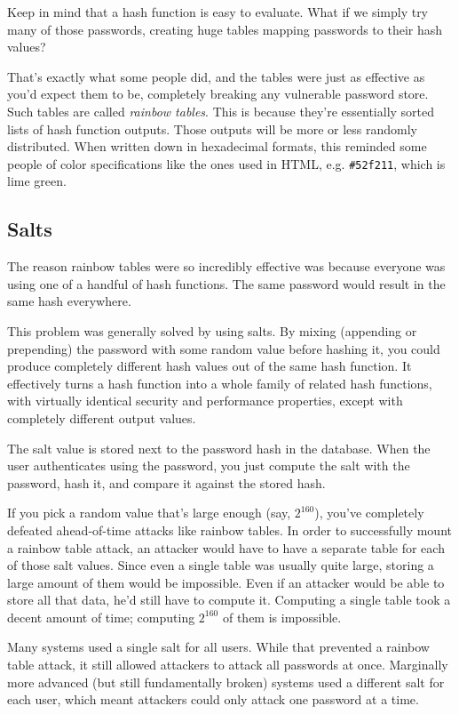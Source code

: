 \documentclass[11pt,ebook,table,dvipsnames]{memoir}
\begin{document}
Keep in mind that a hash function is easy to evaluate. What if we
simply try many of those passwords, creating huge tables mapping
passwords to their hash values?

That's exactly what some people did, and the tables were just as
effective as you'd expect them to be, completely breaking any
vulnerable password store. Such tables are called \emph{rainbow tables}.
This is because they're essentially sorted lists of hash function
outputs. Those outputs will be more or less randomly distributed. When
written down in hexadecimal formats, this reminded some people of
color specifications like the ones used in HTML, e.g. \texttt{\#52f211}, which
is lime green.
\subsection{Salts}
\label{sec-2-6-7-3}

The reason rainbow tables were so incredibly effective was because
everyone was using one of a handful of hash functions. The same
password would result in the same hash everywhere.

This problem was generally solved by using \glspl{salt}. By mixing
(appending or prepending) the password with some random value before
hashing it, you could produce completely different hash values out of
the same hash function. It effectively turns a hash function into a
whole family of related hash functions, with virtually identical
security and performance properties, except with completely different
output values.

The salt value is stored next to the password hash in the database.
When the user authenticates using the password, you just compute the
salt with the password, hash it, and compare it against the stored
hash.

If you pick a random value that's large enough (say, $2^{160}$),
you've completely defeated ahead-of-time attacks like rainbow tables.
In order to successfully mount a rainbow table attack, an attacker
would have to have a separate table for each of those salt values.
Since even a single table was usually quite large, storing a large
amount of them would be impossible. Even if an attacker would be able
to store all that data, he'd still have to compute it. Computing a
single table took a decent amount of time; computing $2^{160}$ of them
is impossible.

Many systems used a single salt for all users. While that prevented a
rainbow table attack, it still allowed attackers to attack all
passwords at once. Marginally more advanced (but still fundamentally
broken) systems used a different salt for each user, which meant
attackers could only attack one password at a time.
\end{document}
